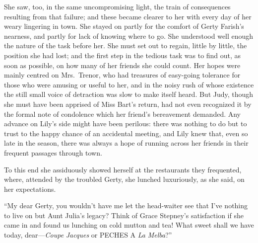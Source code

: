 \documentclass[12pt,a4paper]{book}
\begin{document}
She saw, too, in the same uncompromising light, the train of
consequences resulting from that failure; and these became
clearer to her with every day of her weary lingering in town. She
stayed on partly for the comfort of Gerty Farish's nearness, and
partly for lack of knowing where to go. She understood well
enough the nature of the task before her. She must set out to
regain, little by little, the position she had lost; and the
first step in the tedious task was to find out, as soon as
possible, on how many of her friends she could count. Her hopes
were mainly centred on Mrs.\ Trenor, who had treasures of
easy-going tolerance for those who were amusing or useful to her,
and in the noisy rush of whose existence the still small voice of
detraction was slow to make itself heard. But Judy, though she
must have been apprised of Miss Bart's return, had not even
recognized it by the formal note of condolence which her friend's
bereavement demanded. Any advance on Lily's side might have been
perilous: there was nothing to do but to trust to the happy
chance of an accidental meeting, and Lily knew that, even so late
in the season, there was always a hope of running across her
friends in their frequent passages through town.





To this end she assiduously showed herself at the restaurants
they frequented, where, attended by the troubled Gerty, she
lunched luxuriously, as she said, on her expectations.





``My dear Gerty, you wouldn't have me let the head-waiter see that
I've nothing to live on but Aunt Julia's legacy? Think of Grace
Stepney's satisfaction if she came in and found us lunching on
cold mutton and tea! What sweet shall we have today, dear---\textit{Coupe}
\textit{Jacques} or PECHES A \textit{La} \textit{Melba}?''
\end{document}
